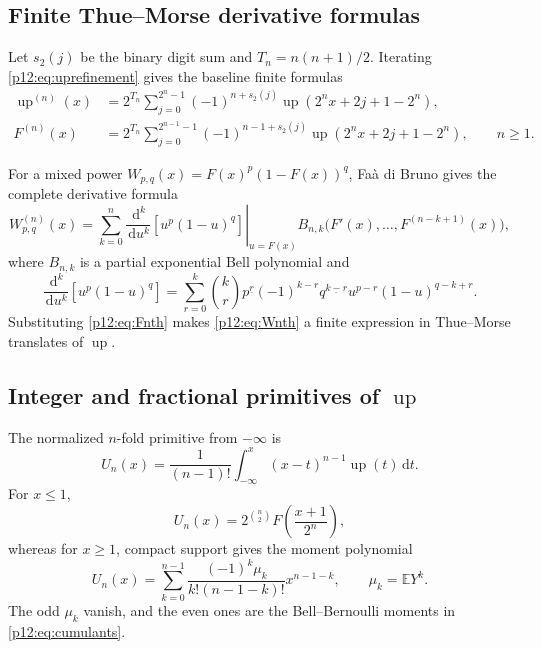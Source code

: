 \documentclass[11pt,oneside]{article}
\theoremstyle{definition}
\theoremstyle{remark}
\newcommand{\F}{F}
\newcommand{\Up}{\operatorname{up}}
\newcommand{\E}{\mathbb E}
\newcommand{\dd}{\,\mathrm d}
\newcommand{\1}{\mathbf 1}
\begin{document}
\subsection{Finite Thue--Morse derivative formulas}

Let \(s_2(j)\) be the binary digit sum and \(T_n=n(n+1)/2\).  Iterating
\eqref{p12:eq:uprefinement} gives the baseline finite formulas
\begin{align}
 \Up^{(n)}(x)
 &=2^{T_n}\sum_{j=0}^{2^n-1}
 (-1)^{n+s_2(j)}
 \Up(2^nx+2j+1-2^n),\label{p12:eq:upnth}\\
 \F^{(n)}(x)
 &=2^{T_n}\sum_{j=0}^{2^{n-1}-1}
 (-1)^{n-1+s_2(j)}
 \Up(2^nx+2j+1-2^n),\qquad n\ge1.
 \label{p12:eq:Fnth}
\end{align}

For a mixed power
\(W_{p,q}(x)=\F(x)^p(1-\F(x))^q\), Fa\`a di Bruno gives the complete derivative
formula
\begin{equation}\label{p12:eq:Wnth}
 W_{p,q}^{(n)}(x)
 =\sum_{k=0}^n
 \left.\frac{\dd^k}{\dd u^k}[u^p(1-u)^q]\right|_{u=\F(x)}
 B_{n,k}\bigl(\F'(x),\ldots,\F^{(n-k+1)}(x)\bigr),
\end{equation}
where \(B_{n,k}\) is a partial exponential Bell polynomial and
\begin{equation}\label{p12:eq:outerderiv}
 \frac{\dd^k}{\dd u^k}[u^p(1-u)^q]
 =\sum_{r=0}^k\binom kr
 p^{\underline r}(-1)^{k-r}q^{\underline{k-r}}
 u^{p-r}(1-u)^{q-k+r}.
\end{equation}
Substituting \eqref{p12:eq:Fnth} makes \eqref{p12:eq:Wnth} a finite expression in
Thue--Morse translates of \(\Up\).

\subsection{Integer and fractional primitives of \(\Up\)}

The normalized \(n\)-fold primitive from \(-\infty\) is
\begin{equation}
 U_n(x)=\frac1{(n-1)!}\int_{-\infty}^x(x-t)^{n-1}\Up(t)\dd t.
\end{equation}
For \(x\le1\),
\begin{equation}\label{p12:eq:upprimitive}
 U_n(x)=2^{\binom n2}\F\!\left(\frac{x+1}{2^n}\right),
\end{equation}
whereas for \(x\ge1\), compact support gives the moment polynomial
\begin{equation}\label{p12:eq:upprimitivepoly}
 U_n(x)=\sum_{k=0}^{n-1}
 \frac{(-1)^k\mu_k}{k!(n-1-k)!}x^{n-1-k},
 \qquad \mu_k=\E Y^k.
\end{equation}
The odd \(\mu_k\) vanish, and the even ones are the Bell--Bernoulli moments in
\eqref{p12:eq:cumulants}.
\end{document}
